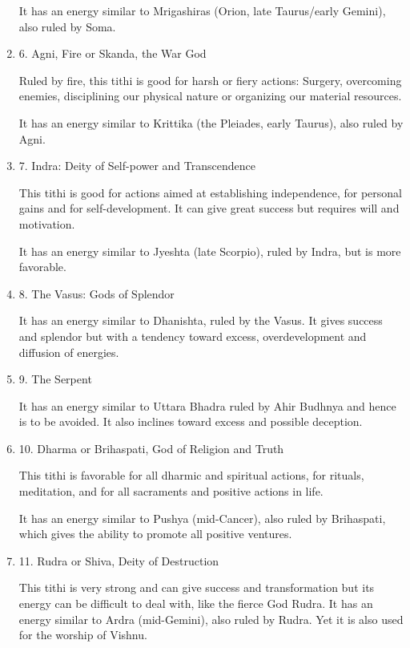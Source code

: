 \begin{enumerate}
It has an energy similar to Mrigashiras (Orion, late Taurus/early Gemini), also ruled by Soma.

 

\item[ ] 6. Agni, Fire or Skanda, the War God

Ruled by fire, this tithi is good for harsh or fiery actions: Surgery, overcoming enemies, disciplining our physical nature or organizing our material resources.

It has an energy similar to Krittika (the Pleiades, early Taurus), also ruled by Agni.

 

\item[ ] 7. Indra: Deity of Self-power and Transcendence

This tithi is good for actions aimed at establishing independence, for personal gains and for self-development. It can give great success but requires will and motivation.

It has an energy similar to Jyeshta (late Scorpio), ruled by Indra, but is more favorable.

 

\item[ ] 8. The Vasus: Gods of Splendor

It has an energy similar to Dhanishta, ruled by the Vasus. It gives success and splendor but with a tendency toward excess, overdevelopment and diffusion of energies.

 

\item[ ] 9. The Serpent

It has an energy similar to Uttara Bhadra ruled by Ahir Budhnya and hence is to be avoided. It also inclines toward excess and possible deception.

 

\item[ ] 10. Dharma or Brihaspati, God of Religion and Truth

This tithi is favorable for all dharmic and spiritual actions, for rituals, meditation, and for all sacraments and positive actions in life.

It has an energy similar to Pushya (mid-Cancer), also ruled by Brihaspati, which gives the ability to promote all positive ventures.

 

\item[ ] 11. Rudra or Shiva, Deity of Destruction

This tithi is very strong and can give success and transformation but its energy can be difficult to deal with, like the fierce God Rudra. It has an energy similar to Ardra (mid-Gemini), also ruled by Rudra. Yet it is also used for the worship of Vishnu.


\end{enumerate}
